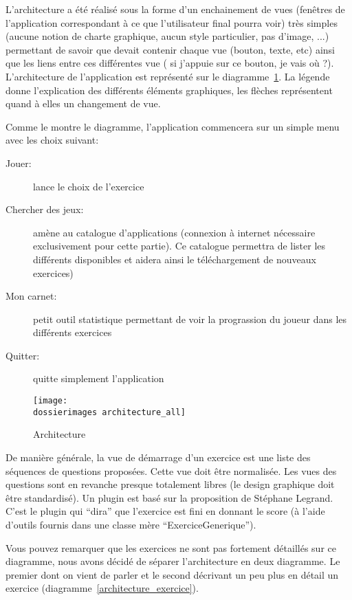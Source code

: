 L'architecture a été réalisé sous la forme d'un enchainement de vues (fenêtres de l'application correspondant à ce que l'utilisateur final pourra voir) très simples (aucune notion de charte graphique, aucun style particulier, pas d'image, ...) permettant de savoir que devait contenir chaque vue (bouton, texte, etc) ainsi que les liens entre ces différentes vue (\og{} si j'appuie sur ce bouton, je vais où ?\fg{}).
\newline
L'architecture de l'application est représenté sur le diagramme~\ref{architecture_all}. La légende donne l'explication des différents éléments graphiques, les flèches représentent quand à elles un changement de vue.

Comme le montre le diagramme, l'application commencera sur un simple menu avec les choix suivant:
\begin{description}
\item[Jouer:] lance le choix de l'exercice
\item[Chercher des jeux:] amène au catalogue d'applications (connexion à internet nécessaire exclusivement pour cette partie). Ce catalogue permettra de lister les différents \plugins{} disponibles et aidera ainsi le téléchargement de nouveaux exercices)
\item[Mon carnet:] petit outil statistique permettant de voir la prograssion du joueur dans les différents exercices
\item[Quitter:] quitte simplement l'application
\end{description}

\begin{figure}[htp]
	\centering
	\texttt{[image: \\dossierimages architecture\_all]}
	\caption{Architecture}
	\label{architecture_all}
\end{figure}De manière générale, la vue de démarrage d’un exercice est une liste des séquences de questions proposées. Cette vue doit être normalisée. Les vues des questions sont en revanche presque totalement libres (le design graphique doit être standardisé). Un plugin est basé sur la proposition de Stéphane Legrand. C’est le plugin qui “dira” que l’exercice est fini en donnant le score (à l’aide d’outils fournis dans une classe mère “ExerciceGenerique”).

Vous pouvez remarquer que les exercices ne sont pas fortement détaillés sur ce diagramme, nous avons décidé de séparer l'architecture en deux diagramme. Le premier dont on vient de parler et le second décrivant un peu plus en détail un exercice (diagramme~\ref{architecture_exercice}).

